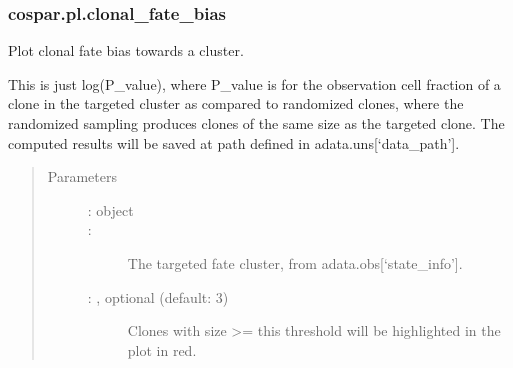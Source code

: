 \documentclass[letterpaper,10pt,english]{sphinxmanual}
\begin{document}
\subsubsection{cospar.pl.clonal\_fate\_bias}
\label{\detokenize{cospar.pl.clonal_fate_bias:cospar-pl-clonal-fate-bias}}\label{\detokenize{cospar.pl.clonal_fate_bias::doc}}

\begin{fulllineitems}
\label{\detokenize{cospar.pl.clonal_fate_bias:cospar.pl.clonal_fate_bias}}
Plot clonal fate bias towards a cluster.

This is just \sphinxhyphen{}log(P\_value), where P\_value is for the observation
cell fraction of a clone in the targeted cluster as compared to
randomized clones, where the randomized sampling produces clones
of the same size as the targeted clone. The computed results will
be saved at path defined in adata.uns{[}‘data\_path’{]}.
\begin{quote}\begin{description}
\item[{Parameters}] \leavevmode\begin{description}
\item[{ :  object}] \leavevmode


\item[{ : }] \leavevmode
The targeted fate cluster, from adata.obs{[}‘state\_info’{]}.

\item[{ : , optional (default: 3)}] \leavevmode
Clones with size \textgreater{}= this threshold will be highlighted in
the plot in red.


\end{description}
\end{description}
\end{quote}
\end{fulllineitems}
\end{document}

